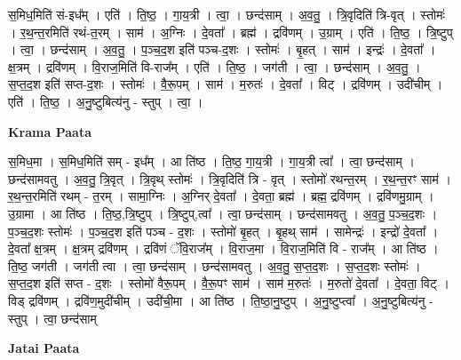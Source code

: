 \documentclass[17pt]{extarticle}
\begin{document}
स॒मिध॒मिति॑ सं-इध᳚म् । एति॑ । ति॒ष्ठ॒ । गा॒य॒त्री । त्वा॒ । छन्द॑साम् । अ॒व॒तु॒ । त्रि॒वृदिति॑ त्रि-वृत् । स्तोमः॑ । र॒थ॒न्त॒रमिति॑ रथं-त॒रम् । साम॑ । अ॒ग्निः । दे॒वता᳚ । ब्रह्म॑ । द्रवि॑णम् । उ॒ग्राम् । एति॑ । ति॒ष्ठ॒ । त्रि॒ष्टुप् । त्वा॒ । छन्द॑साम् । अ॒व॒तु॒ । प॒ञ्च॒द॒श इति॑ पञ्च-द॒शः । स्तोमः॑ । बृ॒हत् । साम॑ । इन्द्रः॑ । दे॒वता᳚ । क्ष॒त्रम् । द्रवि॑णम् । वि॒राज॒मिति॑ वि-राज᳚म् । एति॑ । ति॒ष्ठ॒ । जग॑ती । त्वा॒ । छन्द॑साम् । अ॒व॒तु॒ । स॒प्त॒द॒श इति॑ सप्त-द॒शः । स्तोमः॑ । वै॒रू॒पम् । साम॑ । म॒रुतः॑ । दे॒वता᳚ । विट् । द्रवि॑णम् । उदी॑चीम् । एति॑ । ति॒ष्ठ॒ । अ॒नु॒ष्टुबित्य॑नु - स्तुप् । त्वा॒ ।  \newline


\textbf{Krama Paata} \newline

स॒मिध॒मा । स॒मिध॒मिति॑ सम् - इध᳚म् । आ ति॑ष्ठ । ति॒ष्ठ॒ गा॒य॒त्री । गा॒य॒त्री त्वा᳚ । त्वा॒ छन्द॑साम् । छन्द॑सामवतु । अ॒व॒तु॒ त्रि॒वृत् । त्रि॒वृथ् स्तोमः॑ । त्रि॒वृदिति॑ त्रि - वृत् । स्तोमो॑ रथन्त॒रम् । र॒थ॒न्त॒रꣳ साम॑ । र॒थ॒न्त॒रमिति॑ रथम् - त॒रम् । सामा॒ग्निः । अ॒ग्निर् दे॒वता᳚ । दे॒वता॒ ब्रह्म॑ । ब्रह्म॒ द्रवि॑णम् । द्रवि॑णमु॒ग्राम् । उ॒ग्रामा । आ ति॑ष्ठ । ति॒ष्ठ॒,त्रि॒ष्टुप् । त्रि॒ष्टुप्,त्वा᳚ । त्वा॒ छन्द॑साम् । छन्द॑सामवतु । अ॒व॒तु॒ प॒ञ्च॒द॒शः । प॒ञ्च॒द॒शः स्तोमः॑ । प॒ञ्च॒द॒श इति॑ पञ्च - द॒शः । स्तोमो॑ बृ॒हत् । बृ॒हथ् साम॑ । सामेन्द्रः॑ । इन्द्रो॑ दे॒वता᳚ । दे॒वता᳚ क्ष॒त्रम् । क्ष॒त्रम् द्रवि॑णम् । द्रवि॑णं ॅवि॒राज᳚म् । वि॒राज॒मा । वि॒राज॒मिति॑ वि - राज᳚म् । आ ति॑ष्ठ । ति॒ष्ठ॒ जग॑ती । जग॑ती त्वा । त्वा॒ छन्द॑साम् । छन्द॑सामवतु । अ॒व॒तु॒ स॒प्त॒द॒शः । स॒प्त॒द॒शः स्तोमः॑ । स॒प्त॒द॒श इति॑ सप्त - द॒शः । स्तोमो॑ वैरू॒पम् । वै॒रू॒पꣳ साम॑ । साम॑ म॒रुतः॑ । म॒रुतो॑ दे॒वता᳚ । दे॒वता॒ विट् । विड् द्रवि॑णम् । द्रवि॑ण॒मुदी॑चीम् । उदी॑ची॒मा । आ ति॑ष्ठ । ति॒ष्ठा॒नु॒ष्टुप् । अ॒नु॒ष्टुप्त्वा᳚ । अ॒नु॒ष्टुबित्य॑नु - स्तुप् । त्वा॒ छन्द॑साम् \newline

\textbf{Jatai Paata} \newline
\end{document}
